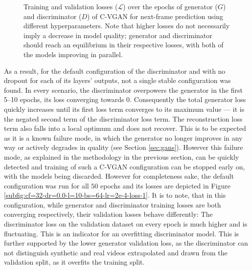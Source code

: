 \begin{figure}
	\caption[C-VGANs' training and validation losses over the epochs. (1)]{Training and validation losses ($\mathcal{L}$) over the epochs of generator ($G$) and discriminator ($D$) of C-VGAN for next-frame prediction using different hyperparameters. Note that higher losses do not necessarily imply a decrease in model quality; generator and discriminator should reach an equilibrium in their respective losses, with both of the models improving in parallel.}
	\label{fig:cvgan_losses_1}
\end{figure}

As a result, for the default configuration of the discriminator and with no dropout for each of its layers' outputs, not a single stable configuration was found. In every scenario, the discriminator overpowers the generator in the first 5--10 epochs, its loss converging towards $0$. Consequently the total generator loss quickly increases until its first loss term converges to its maximum value --- it is the negated second term of the discriminator loss term. The reconstruction loss term also falls into a local optimum and does not recover. This is to be expected as it is a known failure mode, in which the generator no longer improves in any way or actively degrades in quality (see Section \ref{sec:gans}). However this failure mode, as explained in the methodology in the previous section, can be quickly detected and training of such a C-VGAN configuration can be stopped early on, with the models being discarded. However for completeness sake, the default configuration was run for all $50$ epochs and its losses are depicted in Figure \ref{subfig:cf=32-dr=0.0-l=10-bs=64-lr=2e-4-loss-1}. It is to note, that in this configuration, while generator and discriminator training losses are both converging respectively, their validation losses behave differently: The discriminator loss on the validation dataset on every epoch is much higher and is fluctuating. This is an indicator for an overfitting discriminator model. This is further supported by the lower generator validation loss, as the discriminator can not distinguish synthetic and real videos extrapolated and drawn from the validation split, as it overfits the training split.

